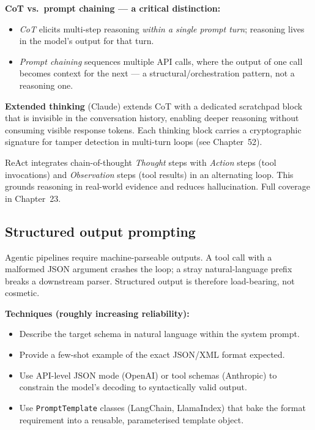 \textbf{CoT vs.\ prompt chaining --- a critical distinction:}
\begin{itemize}
  \item \emph{CoT} elicits multi-step reasoning \emph{within a single prompt turn};
    reasoning lives in the model's output for that turn.
  \item \emph{Prompt chaining} sequences multiple API calls, where the output of one
    call becomes context for the next --- a structural/orchestration pattern, not a
    reasoning one.
\end{itemize}

\textbf{Extended thinking} (Claude) extends CoT with a dedicated scratchpad block
that is invisible in the conversation history, enabling deeper reasoning without
consuming visible response tokens. Each thinking block carries a cryptographic
signature for tamper detection in multi-turn loops (see Chapter~52).

\begin{paperbox}[title=ReAct --- CoT meets tool use (Yao et al.\, 2023)]
  ReAct integrates chain-of-thought \emph{Thought} steps with \emph{Action} steps
  (tool invocations) and \emph{Observation} steps (tool results) in an alternating
  loop. This grounds reasoning in real-world evidence and reduces hallucination.
  Full coverage in Chapter~23.
\end{paperbox}

\subsection{Structured output prompting}

Agentic pipelines require machine-parseable outputs. A tool call with a malformed
JSON argument crashes the loop; a stray natural-language prefix breaks a downstream
parser. Structured output is therefore load-bearing, not cosmetic.

\textbf{Techniques (roughly increasing reliability):}
\begin{itemize}
  \item Describe the target schema in natural language within the system prompt.
  \item Provide a few-shot example of the exact JSON/XML format expected.
  \item Use API-level JSON mode (OpenAI) or tool schemas (Anthropic) to constrain the
    model's decoding to syntactically valid output.
  \item Use \texttt{PromptTemplate} classes (LangChain, LlamaIndex) that bake the
    format requirement into a reusable, parameterised template object.
\end{itemize}

